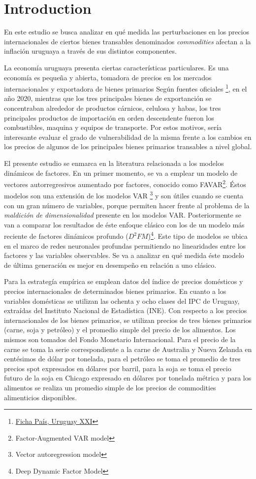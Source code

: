 \chapter{Introduction}\label{chap:intro}

En este estudio se busca analizar en qué medida las perturbaciones en los precios internacionales de ciertos bienes transables denominados \textit{commodities} afectan a la inflación uruguaya a través de sus distintos componentes. 

La economía uruguaya presenta ciertas características particulares. Es una economía es pequeña y abierta, tomadora de precios en los mercados internacionales y exportadora de bienes primarios  Según fuentes oficiales \footnote{\href{https://fichapais.uruguayxxi.gub.uy/}{Ficha País, Uruguay XXI}}, en el año 2020, mientras que los tres principales bienes de exportanción se concentraban alrededor de productos cárnicos, celulosa y habas, los tres principales productos de importación en orden descendente fueron los combustibles, maquina y equipos de transporte. Por estos motivos,  sería interesante evaluar el grado de vulnerabilidad de la misma frente a los cambios en los precios de algunos de los principales bienes primarios transables a nivel global.


El presente estudio se enmarca en la literatura relacionada a los modelos dinámicos de factores. En un primer momento, se va a emplear un modelo de vectores autorregresivos aumentado por factores, conocido como FAVAR\footnote{ Factor-Augmented VAR model}. Éstos modelos son una extensión de los modelos VAR \footnote{ Vector autoregression model} 
y son útiles cuando se cuenta con un gran número de variables, porque permiten hacer frente al problema de la \textit{maldición de dimensionalidad} presente en los modelos VAR. Posteriormente se van a comparar los resultados de éste enfoque clásico con los de un modelo más reciente de factores dinámicos profundo ($D^2FM$)\footnote{Deep Dynamic Factor Model}. Este tipo de modelos se ubica en el marco de redes neuronales profundas permitiendo no linearidades entre los factores y las variables observables. Se va a analizar en qué medida éste modelo de última generación es mejor en desempeño en relación a uno clásico.

Para la estrategía empírica se emplean datos del índice de precios domésticos y precios internacionales de determinados bienes primarios. En cuanto a los variables domésticas se utilizan las ochenta y ocho clases del IPC de Uruguay, extraídas del Instituto Nacional de Estadística (INE).  Con respecto a los precios internacionales de los bienes primarios, se utilizan precios de tres bienes primarios (carne, soja y petróleo) y el promedio simple del precio de los alimentos. Los mismos son tomados del Fondo Monetario Internacional. Para el precio de la carne se toma la serie correspondiente a la carne de Australia y Nueva Zelanda en centésimos de dólar por tonelada, para el petróleo se toma el promedio de tres precios spot expresados en dólares por barril, para la soja
se toma el precio futuro de la soja en Chicago expresado en dólares por tonelada
métrica  y para los alimentos se realiza un promedio simple de los precios de commodities alimenticios disponibles. 